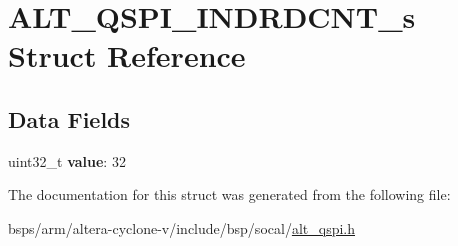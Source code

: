 \hypertarget{structALT__QSPI__INDRDCNT__s}{}\section{A\+L\+T\+\_\+\+Q\+S\+P\+I\+\_\+\+I\+N\+D\+R\+D\+C\+N\+T\+\_\+s Struct Reference}
\label{structALT__QSPI__INDRDCNT__s}
\subsection*{Data Fields}
\begin{DoxyCompactItemize}
\item 
\mbox{\label{structALT__QSPI__INDRDCNT__s_a9c7fa4068fab663d059008803f480d8b}} 
uint32\+\_\+t {\bfseries value}\+: 32
\end{DoxyCompactItemize}


The documentation for this struct was generated from the following file\+:\begin{DoxyCompactItemize}
\item 
bsps/arm/altera-\/cyclone-\/v/include/bsp/socal/\mbox{\hyperlink{include_2bsp_2socal_2alt__qspi_8h}{alt\+\_\+qspi.\+h}}\end{DoxyCompactItemize}
